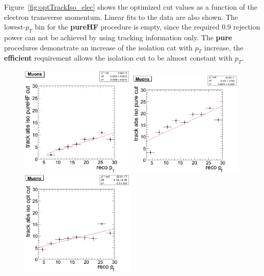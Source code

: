 \documentclass{cmspaper}
\begin{document}
Figure~\ref{fig:optTrackIso_elec} shows the optimized cut values as a function of the electron
transverse momentum. Linear fits to the data are also shown. The lowest-$p_T$ bin for the
{\bf pureHF}  procedure is empty, since the required 0.9 rejection power can not be achieved
by using tracking information only. The {\bf pure} procedures demonstrate an increase of the
isolation cat with $p_T$ increase, the {\bf efficient} requirement allows the isolation cut
to be almost constant with $p_T$.

\begin{figure}[htbp]
\begin{center}
   \includegraphics[width = 0.49\textwidth]{pictures/optIsoCut/trackIso_muon_pure_HF.png}
   \includegraphics[width = 0.49\textwidth]{pictures/optIsoCut/trackIso_muon_pure.png}
   \includegraphics[width = 0.49\textwidth]{pictures/optIsoCut/trackIso_muon_opt.png}

\end{center}
\end{figure}
\end{document}
